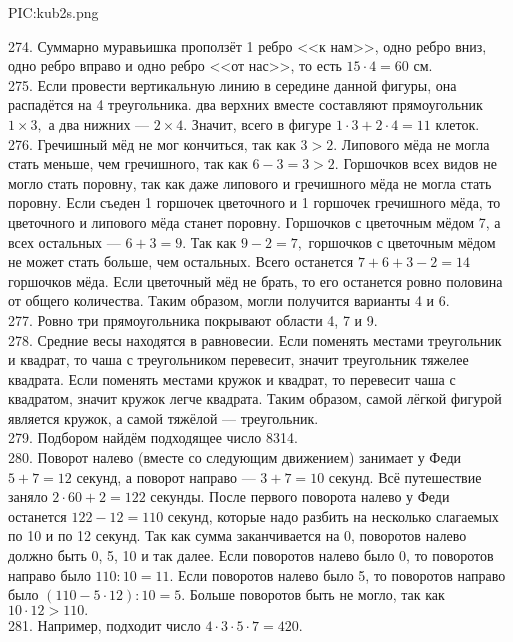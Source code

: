 \begin{center}
{{PIC:kub2s.png}}
\end{center}
274. Суммарно муравьишка проползёт 1 ребро <<к нам>>, одно ребро вниз, одно ребро вправо и одно ребро <<от нас>>, то есть $15\cdot4=60$ см.\\
275. Если провести вертикальную линию в середине данной фигуры, она распадётся на 4 треугольника. два верхних вместе составляют прямоугольник $1\times3,$ а два нижних --- $2\times4.$ Значит, всего в фигуре $1\cdot3+2\cdot4=11$ клеток.\\
276. Гречишный мёд не мог кончиться, так как $3>2.$ Липового мёда не могла стать меньше, чем гречишного, так как $6-3=3>2.$ Горшочков всех видов не могло стать поровну, так как даже липового и гречишного мёда не могла стать поровну. Если съеден 1 горшочек цветочного и 1 горшочек гречишного мёда, то цветочного и липового мёда станет поровну. Горшочков с цветочным мёдом 7, а всех остальных --- $6+3=9.$ Так как $9-2=7,$ горшочков с цветочным мёдом не может стать больше, чем остальных. Всего останется $7+6+3-2=14$ горшочков мёда. Если цветочный мёд не брать, то его останется ровно половина от общего количества. Таким образом, могли получится варианты 4 и 6.\\
277. Ровно три прямоугольника покрывают области 4, 7 и 9.\\
278. Средние весы находятся в равновесии. Если поменять местами треугольник и квадрат, то чаша с треугольником перевесит, значит треугольник тяжелее квадрата. Если поменять местами кружок и квадрат, то перевесит чаша с квадратом, значит кружок легче квадрата. Таким образом, самой лёгкой фигурой является кружок, а самой тяжёлой --- треугольник.\\
279. Подбором найдём подходящее число 8314.\\
280. Поворот налево (вместе со следующим движением) занимает у Феди $5+7=12$ секунд, а поворот направо --- $3+7=10$ секунд. Всё путешествие заняло $2\cdot60+2=122$ секунды. После первого поворота налево у Феди останется $122-12=110$ секунд, которые надо разбить на несколько слагаемых по 10 и по 12 секунд. Так как сумма заканчивается на 0, поворотов налево должно быть 0, 5, 10 и так далее. Если поворотов налево было 0, то поворотов направо было $110:10=11.$ Если поворотов налево было 5, то поворотов направо было $(110-5\cdot12):10=5.$ Больше поворотов быть не могло, так как $10\cdot12>110.$\\
281. Например, подходит число $4\cdot3\cdot5\cdot7=420.$\\

